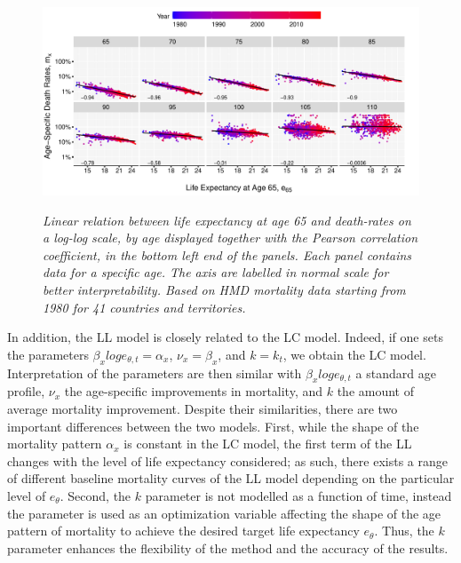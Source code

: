 \documentclass[risks,article,submit,moreauthors,pdftex]{Definitions/mdpi}
\begin{document}
\begin{figure}[!t]

{\centering \includegraphics[width=1\linewidth]{Figure2-1}}

\caption{\textit{Linear relation between life expectancy at age 65 and death-rates on a log-log scale, by age displayed together with the Pearson correlation coefficient, in the bottom left end of the panels. Each panel contains data for a specific age. The axis are labelled in normal scale for better interpretability. Based on HMD mortality data starting from 1980 for 41 countries and territories.}}\label{fig:Figure2}
\end{figure}

In addition, the LL model is closely related to the LC model. Indeed, if one sets the parameters  $\beta_x log{e_{\theta,t}} = \alpha_x$, $\nu_x = \beta_x$, and $k = k_t$, we obtain the LC model. Interpretation of the parameters are then similar with $\beta_x log{e_{\theta,t}}$ a standard age profile, $\nu_x$ the age-specific improvements in mortality, and $k$ the amount of average mortality improvement. Despite their similarities, there are two important differences between the two models. First, while the shape of the mortality pattern $\alpha_x$ is constant in the LC model, the first term of the LL changes with the level of life expectancy considered; as such, there exists a range of different baseline mortality curves of the LL model depending on the particular level of $e_\theta$. Second, the $k$ parameter is not modelled as a function of time, instead the parameter is used as an optimization variable affecting the shape of the age pattern of mortality to achieve the desired target life expectancy $e_\theta$. Thus, the $k$ parameter enhances the flexibility of the method and the accuracy of the results.

\end{document}
